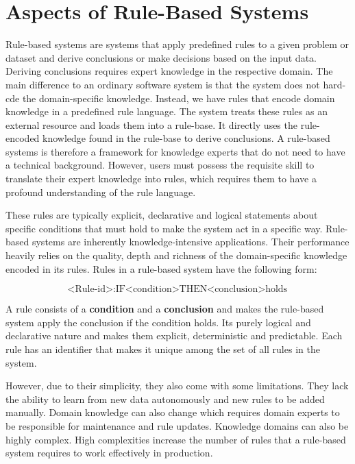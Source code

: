 \section{Aspects of Rule-Based Systems}\label{sec:aspects-of-rule-based-systems}

Rule-based systems are systems that apply predefined rules to a given problem or dataset
and derive conclusions or make decisions based on the input data\cite{grosan2011rule}.
Deriving conclusions requires expert knowledge in the respective domain.
The main difference to an ordinary software system is that the system does not hard-cde the domain-specific knowledge.
Instead, we have rules that encode domain knowledge in a predefined rule language.
The system treats these rules as an external resource and loads them into a rule-base.
It directly uses the rule-encoded knowledge found in the rule-base to derive conclusions.
A rule-based systems is therefore a framework for knowledge experts that do not need to have a technical background.
However, users must possess the requisite skill to translate their expert knowledge into rules,
which requires them to have a profound understanding of the rule language.


These rules are typically explicit,
declarative and logical statements about specific conditions that must hold to make the system act in a specific way.
Rule-based systems are inherently knowledge-intensive applications\cite{hayes1985rule}.
Their performance heavily relies on the quality,
depth and richness of the domain-specific knowledge encoded in its rules.
Rules in a rule-based system have the following form:

\[
    \text{<Rule-id>}: \text{IF} \text{<condition>} \text{THEN} \text{<conclusion>} \text{holds}
\]


A rule consists of a \textbf{condition} and a \textbf{conclusion}
and makes the rule-based system apply the conclusion if the condition holds.
Its purely logical and declarative nature and makes them explicit, deterministic and predictable.
Each rule has an identifier that makes it unique among the set of all rules in the system.

However, due to their simplicity, they also come with some limitations.
They lack the ability to learn from new data autonomously and new rules to be added manually.
Domain knowledge can also change which requires domain experts to be responsible for maintenance and rule updates.
Knowledge domains can also be highly complex.
High complexities increase the number of rules that a rule-based system requires to work effectively in production.


